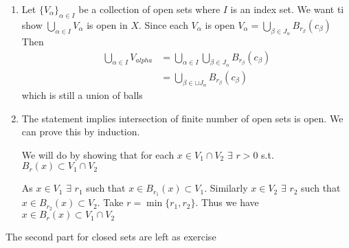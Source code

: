 \begin{myproof}
	\begin{enumerate}
		\item Let $\{V_{\alpha}\}_{\alpha\in I}$ be a collection of open sets where $I$ is an index set. We want ti show $\bigcup\limits_{\alpha\in I}V_{\alpha}$ is open in $X$. Since each $V_{\alpha}$ is open $V_{\alpha}=\bigcup\limits_{\beta \in J_{\alpha}} B_{r_{\beta}}(c_{\beta})$ Then \begin{align*}
			      \bigcup\limits_{\alpha\in I} V_{alpha} & =\bigcup\limits_{\alpha\in I}\bigcup\limits_{\beta \in J_{\alpha}}B_{r_{\beta}}(c_{\beta}) \\
			                                             & =\bigcup\limits_{\beta \in \sqcup J_{\alpha}}B_{r_{\beta}}(c_{\beta})
		      \end{align*} which is still a union of balls
		      \Qed
		\item \setlength{\parindent}{1cm}The statement implies intersection of finite number of open sets is open. We can prove this by induction.

		      We will do by showing that for each $x\in V_1\cap V_2$ $\exists$ $r>0$ s.t. $B_r(x)\subset V_1\cap V_2$

		      \begin{center}
		      \end{center}
		      As $x\in V_1$ $\exists$ $r_1$ such that $x\in B_{r_1}(x)\subset V_1$. Similarly $x\in V_2$ $\exists$ $r_2$ such that $x\in B_{r_2}(x)\subset V_2$. Take $r=\min\{r_1,r_2\}$. Thus we have $x\in B_r(x)\subset V_1\cap V_2$

	\end{enumerate}
	The second part for closed sets are left as exercise
\end{myproof}

